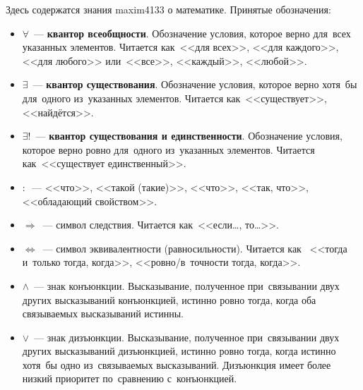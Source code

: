 Здесь содержатся знания maxim4133 о математике. Принятые обозначения:
\begin{itemize}
	\item $\forall$~--- \textbf{квантор всеобщности}. Обозначение условия, которое верно для~всех
	указанных элементов. Читается как~<<для всех>>, <<для каждого>>, <<для любого>> или~<<все>>,
	<<каждый>>, <<любой>>.
	\item $\exists$~--- \textbf{квантор существования}. Обозначение условия, которое верно хотя~бы
	для~одного из~указанных элементов. Читается как~<<существует>>, <<найдётся>>.
	\item $\exists!$~--- \textbf{квантор существования и единственности}. Обозначение условия,
	которое верно ровно для~одного из~указанных элементов. Читается как~<<существует единственный>>.
	\item $\colon$~--- <<что>>, <<такой (такие)>>, <<что>>, <<так, что>>, <<обладающий свойством>>.
	\item $\Rightarrow$~--- символ следствия. Читается как~<<если\dots, то\dots>>.
	\item $\Leftrightarrow$~--- символ эквивалентности (равносильности). Читается как
	~<<тогда и~только тогда, когда>>, <<ровно/в~точности тогда, когда>>.
	\item $\land$~--- знак конъюнкции. Высказывание, полученное при~связывании двух других
	высказываний конъюнкцией, истинно ровно тогда, когда оба связываемых высказываний истинны.
	\item $\lor$~--- знак дизъюнкции. Высказывание, полученное при~связывании двух других
	высказываний дизъюнкцией, истинно ровно тогда, когда истинно хотя~бы одно из~связываемых
	высказываний. Дизъюнкция имеет более низкий приоритет по~сравнению с~конъюнкцией.
\end{itemize}